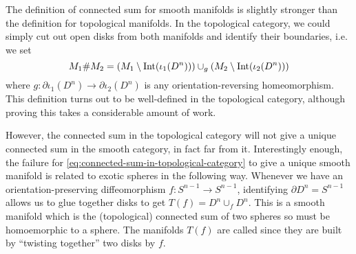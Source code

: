	The definition of connected sum for smooth manifolds is slightly stronger than the definition for topological manifolds. In the topological category, we could simply cut out open disks from both manifolds and identify their boundaries, i.e. we set
	\begin{equation}\label{eq:connected-sum-in-topological-category}
		M_1\# M_2 = (M_1\setminus {\operatorname{Int}}(\iota_1(D^n)))\cup_g (M_2\setminus {\operatorname{Int}}(\iota_2(D^n)))
	\end{equation}
	where $g : \partial \iota_1(D^n) \to \partial \iota_2(D^n)$ is any orientation-reversing homeomorphism. This definition turns out to be well-defined in the topological category, although proving this takes a considerable amount of work. 

	However, the connected sum in the topological category will not give a unique connected sum in the smooth category, in fact far from it. Interestingly enough, the failure for \cref{eq:connected-sum-in-topological-category} to give a unique smooth manifold is related to exotic spheres in the following way. Whenever we have an orientation-preserving diffeomorphism $f: S^{n-1}\to S^{n-1}$, identifying $\partial D^n = S^{n-1}$ allows us to glue together disks to get $T(f)=D^n\cup_f D^n$. This is a smooth manifold which is the (topological) connected sum of two spheres so must be homoemorphic to a sphere. The manifolds $T(f)$ are called  since they are built by ``twisting together'' two disks by $f$. 

